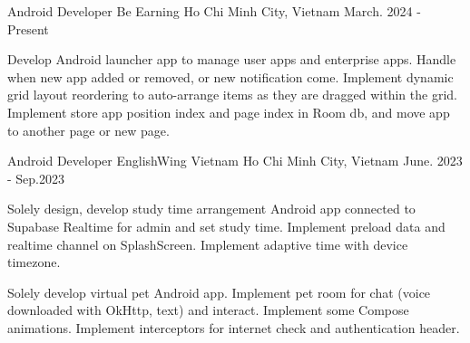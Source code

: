 \begin{cventries}
    \cventry
    {Android Developer}
    {Be Earning}
    {Ho Chi Minh City, Vietnam}
    {March. 2024 - Present}
    {
        \begin{cvitems}
            \item {
                Develop Android launcher app to manage user apps and enterprise apps.
                Handle when new app added or removed, or new notification come.
                Implement dynamic grid layout reordering to auto-arrange items as they are dragged within the grid.
                Implement store app position index and page index in Room db, and move app to another page or new page.
            }
        \end{cvitems}
    }
    \cventry
    {Android Developer}
    {EnglishWing Vietnam}
    {Ho Chi Minh City, Vietnam}
    {June. 2023 - Sep.2023}
    {
        \begin{cvitems}
            \item {
                Solely design, develop study time arrangement Android app connected to Supabase Realtime for admin and set study time.
                Implement preload data and realtime channel on SplashScreen.
                Implement adaptive time with device timezone.
            }
            \item {
                Solely develop virtual pet Android app.
                Implement pet room for chat (voice downloaded with OkHttp, text) and interact.
                Implement some Compose animations.
                Implement interceptors for internet check and authentication header.
            }
        \end{cvitems}
    }
\end{cventries}
